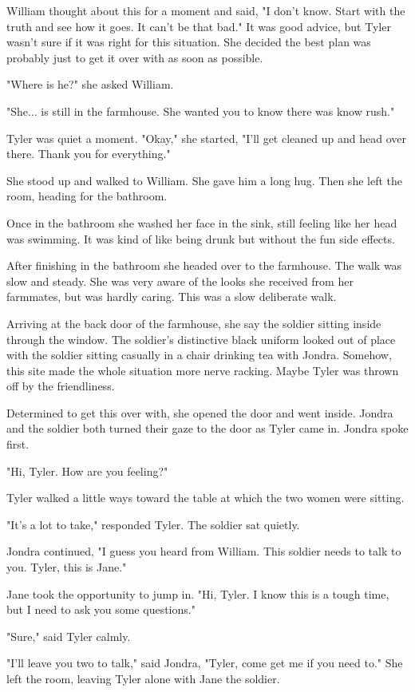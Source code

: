 \documentclass[courier]{sffms}
\begin{document}
William thought about this for a moment
and said, "I don't know. Start with the
truth and see how it goes. It can't be that
bad." It was good advice, but Tyler wasn't
sure if it was right for this situation. She
decided the best plan was probably just
to get it over with as soon as possible.

"Where is he?" she asked William.

"She... is still in the farmhouse. She wanted
you to know there was know rush."

Tyler was quiet a moment. "Okay," she
started, "I'll get cleaned up and head over
there. Thank you for everything."

She stood up and walked to William. She
gave him a long hug. Then she left the
room, heading for the bathroom.

Once in the bathroom 
she washed her face in the sink, still
feeling like her head was swimming. It
was kind of like being drunk but without
the fun side effects.

After finishing in the bathroom she headed
over to the farmhouse. The walk was slow
and steady. She was very aware of the looks
she received from her farmmates, but was
hardly caring. This was a slow deliberate walk.

Arriving at the back door of the farmhouse,
she say the soldier sitting inside through 
the window. The soldier's distinctive black
uniform looked out of place with the soldier
sitting casually in a chair drinking tea with
Jondra. Somehow, this site made the whole
situation more nerve racking. Maybe Tyler
was thrown off by the friendliness.

Determined to get this over with, she
opened the door and went inside. Jondra
and the soldier both turned their gaze
to the door as Tyler came in. Jondra
spoke first.

"Hi, Tyler. How are you feeling?"

Tyler walked a little ways toward the
table at which the two women were
sitting.

"It's a lot to take," responded Tyler. The
soldier sat quietly.

Jondra continued, "I guess you heard
from William. This soldier needs to talk
to you. Tyler, this is Jane."

Jane took the opportunity to jump in.
"Hi, Tyler. I know this is a tough time,
but I need to ask you some questions."

"Sure," said Tyler calmly.

"I'll leave you two to talk," said Jondra,
"Tyler, come
get me if you need to." She left the room,
leaving Tyler alone with Jane the soldier.
\end{document}
